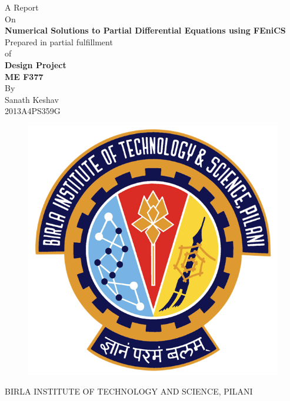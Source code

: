 \documentclass[11pt]{report}
\begin{document}
	\begin{titlepage}
		\begin{center}
			{\Large A Report}\\[1cm]
			{\Large On}\\[1cm]
			{\LARGE \textbf{Numerical Solutions to Partial Differential Equations using FEniCS}}\\[1cm]
			{\Large Prepared in partial fulfillment}\\[1cm]
			{\Large of}\\[1cm]
			{\Large \textbf{Design Project}}\\[0.5cm]
			{\Large \textbf{ME F377}}\\[1cm]

			{\Large By}\\[1cm]
			{\Large Sanath Keshav}\\[0.1cm]
			{\Large 2013A4PS359G}\\[0.3cm]

			\begin{figure}[h]
				\centering
				\includegraphics[scale=0.7]{bits_logo.png}
			\end{figure}

			\textsc{BIRLA INSTITUTE OF TECHNOLOGY AND SCIENCE, PILANI}
		\end{center}
	\end{titlepage}
\end{document}
